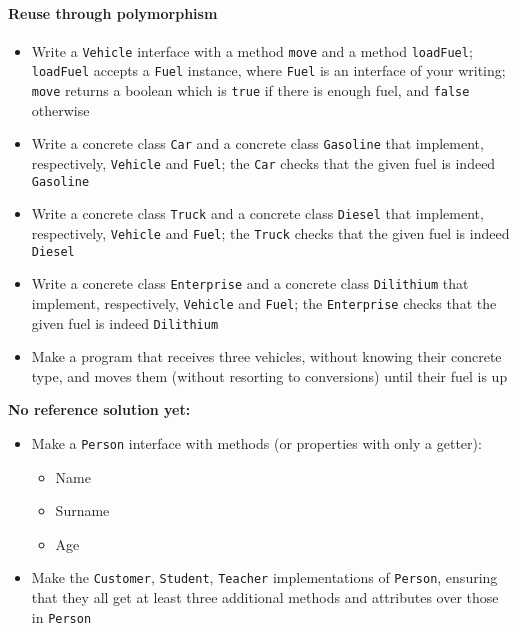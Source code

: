 \documentclass[12pt,a4paper,final]{article}
\begin{document}
		\paragraph{Reuse through polymorphism}
		\begin{itemize}
			\item Write a \texttt{Vehicle} interface with a method \texttt{move} and a method \texttt{loadFuel}; \texttt{loadFuel} accepts a \texttt{Fuel} instance, where \texttt{Fuel} is an interface of your writing; \texttt{move} returns a boolean which is \texttt{true} if there is enough fuel, and \texttt{false} otherwise
			\item Write a concrete class \texttt{Car} and a concrete class \texttt{Gasoline} that implement, respectively, \texttt{Vehicle} and \texttt{Fuel}; the \texttt{Car} checks that the given fuel is indeed \texttt{Gasoline}
			\item Write a concrete class \texttt{Truck} and a concrete class \texttt{Diesel} that implement, respectively, \texttt{Vehicle} and \texttt{Fuel}; the \texttt{Truck} checks that the given fuel is indeed \texttt{Diesel}
			\item Write a concrete class \texttt{Enterprise} and a concrete class \texttt{Dilithium} that implement, respectively, \texttt{Vehicle} and \texttt{Fuel}; the \texttt{Enterprise} checks that the given fuel is indeed \texttt{Dilithium}
			\item Make a program that receives three vehicles, without knowing their concrete type, and moves them (without resorting to conversions) until their fuel is up
		\end{itemize}
		
		\textbf{No reference solution yet:}
		\begin{itemize}
			\item Make a \texttt{Person} interface with methods (or properties with only a getter):
			\begin{itemize}
				\item Name
				\item Surname
				\item Age
			\end{itemize}
			
			\item Make the \texttt{Customer}, \texttt{Student}, \texttt{Teacher} implementations of \texttt{Person}, ensuring that they all get at least three additional methods and attributes over those in \texttt{Person}		
		\end{itemize}
\end{document}
